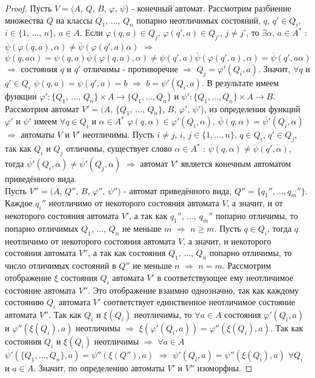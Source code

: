 \documentclass[a4paper, 12pt]{article}
\renewcommand{\phi}{\varphi}
\theoremstyle{definition}
\theoremstyle{plain}
\theoremstyle{remark}
\begin{document}
  \begin{proof}
    Пусть $V=(A$, $Q$, $B$, $\phi$, $\psi$) - конечный автомат. Рассмотрим разбиение множества $Q$ на классы $Q_1$, $\ldots$, $Q_n$ попарно неотличимых состояний, $q$, $q'\in Q_i$, $i\in\{1$, $\ldots$, $n\}$, $a\in A$. Если $\phi(q,a)\in Q_j$, $\phi(q',a)\in Q_{j'}$, $j\neq j'$, то $\exists \alpha$, $a\in A^*$ : $\overline{\psi}(\phi(q,a),\alpha)\neq\overline{\psi}(\phi(q',a)\alpha)$ $\Longrightarrow$ $\overline{\psi}(q,a\alpha)=\psi(q,a)\overline{\psi}(\phi(q,a),\alpha)\neq\psi(q',a)\overline{\psi}(\phi(q',a),\alpha)=\overline{\psi}(q',a\alpha)$ $\Longrightarrow$ состояния $q$ и $q'$ отличимы - противоречие $\Longrightarrow$ $Q_{j}=\phi'(Q_i,a)$. Значит, $\forall q$ и $q'\in Q_i$ $\psi(q,a)=\psi(q',a)=b$ $\Longrightarrow$ $b=\psi'(Q_i,a)$. В результате имеем функции $\phi':\{Q_1$, $\ldots$, $Q_n\}\times A\rightarrow \{Q_1,\ldots, Q_n\}$ и $\psi':\{Q_1,\ldots, Q_n\}\times A\rightarrow B$. Рассмотрим автомат $V'=(A$, $\{Q_1$, $\ldots$, $Q_n\}$, $B$, $\phi'$, $\psi'$), из определения функций $\phi'$ и $\psi'$ имеем $\forall q\in Q_i$ и $\alpha\in A^*$ $\phi(q,\alpha)\in \phi'(Q_i, \alpha)$, $\overline{\psi}(q,\alpha)=\overline{\psi'}(Q_i,\alpha)$ $\Longrightarrow$ автоматы $V$ и $V'$ неотличимы. Пусть $i\neq j$, $i$, $j\in\{1,\ldots, n\}$, $q\in Q_i$, $q'\in Q_j$, так как $Q_i$ и $Q_j$ отличимы, существует слово $\alpha\in A^*$ : $\overline{\psi}(q,\alpha)\neq\overline{\psi}(q',\alpha)$, тогда $\overline{\psi'}(Q_i, \alpha)\neq\overline{\psi'}(Q_j,\alpha)$ $\Longrightarrow$ автомат $V'$ является конечным автоматом приведённого вида.\\
    Пусть $V''=(A$, $Q''$, $B$, $\phi''$, $\psi'')$ - автомат приведённого вида, $Q''=\{q_1'',\ldots, q_m''\}$. Каждое $q_i''$ неотличимо от некоторого состояния автомата $V$, а значит, и от некоторого состояния автомата $V'$, а так как $q_1''$, $\ldots$, $q_m''$ попарно отличимы, то попарно отличимых $Q_1$, $\ldots$, $Q_n$ не меньше $m$ $\Longrightarrow$ $n\geqslant m$. Пусть $q\in Q_i$, тогда $q$ неотличимо от некоторого состояния автомата $V$, а значит, и некоторого состояния автомата $V''$, а так как состояния $Q_1$, $\ldots$, $Q_n$ попарно отличимы, то число отличимых состояний в $Q''$ не меньше $n$ $\Longrightarrow$ $n=m$. Рассмотрим отображение $\xi$ состояния $Q_i$ автомата $V'$ в соответствующее ему неотличимое состояние автомата $V''$. Это отображение взаимно однозначно, так как каждому состоянию $Q_i$ автомата $V'$ соответствует единственное неотличимое состояние автомата $V''$. Так как $Q_i$ и $\xi(Q_i)$ неотличимы, то $\forall a\in A$ состояния $\phi'(Q_i,a)$ и $\phi''(\xi(Q_i),a)$ неотличимы $\Longrightarrow$ $\xi(\phi'(Q_i,a))=\phi''(\xi(Q_i),a)$. Так как состояния $Q_i$ и $\xi(Q_i)$ неотличимы $\Longrightarrow$ $\forall a\in A$ $\overline{\psi'}(\{Q_1,\ldots,Q_n\},a)=\overline{\psi''}(\xi(Q''),a)$ $\Longrightarrow$ $\psi'(Q_i,a)=\psi''(\xi(Q_i),a)$ $\forall Q_i$ и $a\in A$. Значит, по определению автоматы $V'$ и $V''$ изоморфны.
  \end{proof}
\end{document}

